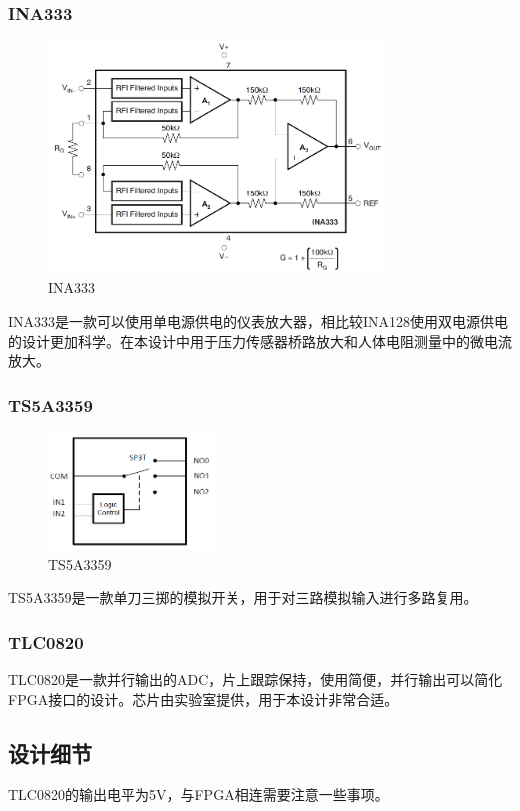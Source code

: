 \documentclass[16pt,a4paper]{article}
\begin{document}
\subsubsection{INA333}
\begin{figure}[H]
\centering
\includegraphics[width=0.8\textwidth]{INA333.png}
\caption{INA333}
\end{figure}
INA333是一款可以使用单电源供电的仪表放大器，相比较INA128使用双电源供电的设计更加科学。在本设计中用于压力传感器桥路放大和人体电阻测量中的微电流放大。

\subsubsection{TS5A3359}
\begin{figure}[H]
\centering
\includegraphics[width=0.4\textwidth]{TS5A3359.png}
\caption{TS5A3359}
\end{figure}
TS5A3359是一款单刀三掷的模拟开关，用于对三路模拟输入进行多路复用。

\subsubsection{TLC0820}
TLC0820是一款并行输出的ADC，片上跟踪保持，使用简便，并行输出可以简化FPGA接口的设计。芯片由实验室提供，用于本设计非常合适。

\subsection{设计细节}
TLC0820的输出电平为5V，与FPGA相连需要注意一些事项。\\
\end{document}
